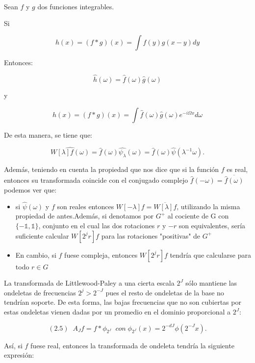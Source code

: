 \begin{teorema} \label{Teorema::Convolucion}
 Sean $f$ y $g$ dos funciones integrables.

 Si 

 $$h(x)=(f\ast g)(x)=\int f(y)g(x-y) dy$$

 Entonces: 

 $$\widehat{h}(\omega)=\widehat{f}(\omega) \widehat{g}(\omega)$$

 y 

 $$h(x)=(f \ast g)(x)= \int \widehat{f}(\omega) \widehat{g}(\omega) e^{-i\Omega x} d\omega$$
 
\end{teorema}

De esta manera, se tiene que: 

$$\widehat{W[\lambda]f(\omega)}=\widehat{f}(\omega)\widehat{\psi_\lambda}(\omega)=\widehat{f}(\omega)\widehat{\psi}(\lambda^{-1}\omega).$$

\noindent Además, teniendo en cuenta la propiedad que nos dice que si la función $f$ es real, entonces su transformada coincide con el conjugado complejo $\widehat{f}(-\omega)=\overline{\widehat{f}(\omega)}$ podemos ver que: 

\begin{itemize}
  \item si $\widehat{\psi}(\omega)$ y $f$ son reales entonces $W[-\lambda]f= \overline{W[\lambda]f}$, utilizando la misma propiedad de antes.Además, si denotamos por $G^{+}$ al cociente de G con $\lbrace-\mathbb{1},\mathbb{1}\rbrace$, conjunto en el cual las dos rotaciones $r$ y $-r$ son equivalentes, sería suficiente calcular $W[2^jr]f$ para las rotaciones "positivas" de $G^{+}$
  \item En cambio, si $f$ fuese compleja, entonces $W[2^jr]f$ tendría que calcularse para todo $r \in G$
\end{itemize}

\medskip
 
\noindent La transformada de Littlewood-Paley a una cierta escala $2^J$ sólo mantiene las ondeletas de frecuencias $2^j>2^{-J}$ pues el resto de ondeletas de la base no tendrían soporte. De esta forma, las bajas frecuencias que no son cubiertas por estas ondeletas vienen dadas por un promedio en el dominio proporcional a $2^J$:

$$(2.5) \; \; A_Jf=f \ast \phi_ {2^J} \; \; con \; \phi_ {2^J}(x)=2^{-dJ} \phi(2^{-J}x). $$
\medskip

\noindent Así, si $f$ fuese real, entonces la transformada de ondeleta tendría la siguiente expresión: 

